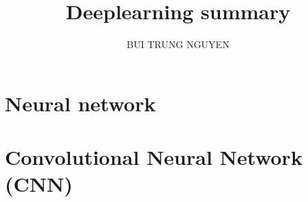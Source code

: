 \documentclass[hidelink,12pt]{report}
\author{BUI TRUNG NGUYEN}
\affil{Sorbonne Paris Nord University}
\title{Deeplearning summary}
\begin{document}
\maketitle
\pagestyle{fancy}
\tableofcontents
\newpage

\chapter{Neural network}


\chapter{Convolutional Neural Network (CNN)}

\end{document}
